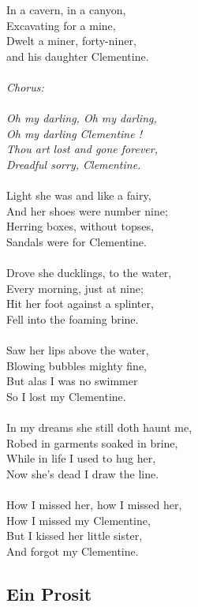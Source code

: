 \documentclass[a5paper]{article}
\begin{document}
In a cavern, in a canyon,\\
Excavating for a mine,\\
Dwelt a miner, forty-niner, \\
and his daughter Clementine.\\
\\
\textit{Chorus:\\
\\
Oh my darling, Oh my darling, \\
Oh my darling Clementine ! \\
Thou art lost and gone forever, \\
Dreadful sorry, Clementine.}\\
\\
Light she was and like a fairy, \\
And her shoes were number nine; \\
Herring boxes, without topses, \\
Sandals were for Clementine.\\
\\
Drove she ducklings, to the water,\\
Every morning, just at nine;  \\
Hit her foot against a splinter,  \\
Fell into the foaming brine.\\
\\
Saw her lips above the water, \\
Blowing bubbles mighty fine, \\
But alas I was no swimmer \\
So I lost my Clementine.\\
\\
In my dreams she still doth haunt me, \\
Robed in garments soaked in brine, \\
While in life I used to hug her, \\
Now she's dead I draw the line.\\
\\
How I missed her, how I missed her, \\
How I missed my Clementine, \\
But I kissed her little sister, \\
And forgot my Clementine.\\

\subsection{Ein Prosit} %
\label{sub:ein_prosit}
\end{document}
